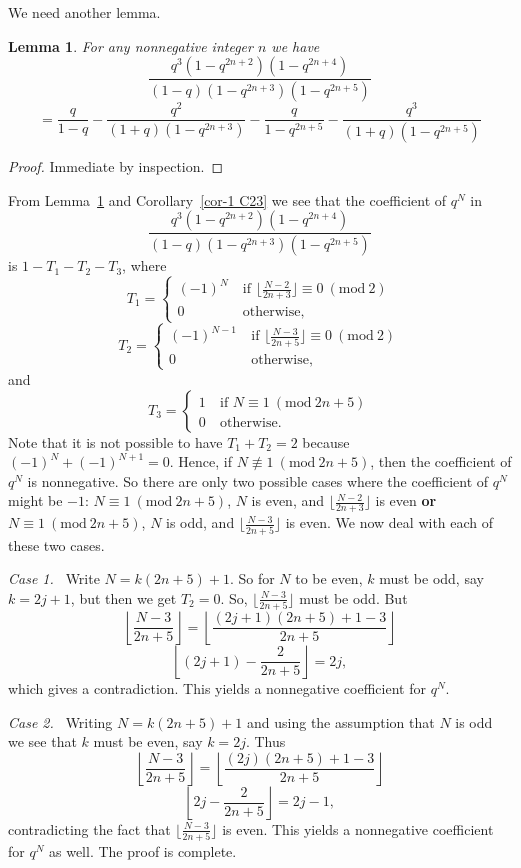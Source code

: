 \documentclass[reqno]{amsart}
\theoremstyle{definition}
\theoremstyle{plain}
\newtheorem{lemma}      {Lemma}
\theoremstyle{remark}
\numberwithin{equation}{section}
\newcommand{\Mod}[1]{\ (\mathrm{mod}\ #1)}
\newcommand{\fr}{\frac}
\begin{document}
%
We need another lemma.
\begin{lemma}\label{lem-2 C23}
For any nonnegative integer $n$ we have
\[
\fr{q^3(1-q^{2n+2})(1-q^{2n+4})}{(1-q)(1-q^{2n+3})(1-q^{2n+5})}
\]
\[
=\fr{q}{1-q}-\fr{q^2}{(1+q)(1-q^{2n+3})}-\fr{q}{1-q^{2n+5}} -\fr{q^3}{(1+q)(1-q^{2n+5})}
\]
\end{lemma}
\begin{proof}
Immediate by inspection.
\end{proof}
From Lemma~\ref{lem-2 C23} and Corollary~\ref{cor-1 C23} we see that the coefficient of $q^N$ in
\[
\fr{q^3(1-q^{2n+2})(1-q^{2n+4})}{(1-q)(1-q^{2n+3})(1-q^{2n+5})}
\]
is $1-T_1-T_2-T_3$,
where
\[
T_1=
 \begin{cases}
(-1)^N &\ \text{if\ }\lfloor \fr{N-2}{2n+3} \rfloor \equiv 0\Mod{2} \\
0&\ \text{otherwise},
\end{cases}
\]
\[
T_2=
\begin{cases}
(-1)^{N-1} &\ \text{if\ }\lfloor \fr{N-3}{2n+5} \rfloor \equiv 0\Mod{2} \\
0&\ \text{otherwise},
\end{cases}
\]
and
\[
T_3=
\begin{cases}
1 &\ \text{if\ } N \equiv 1 \Mod{2n+5} \\
0&\ \text{otherwise}.
\end{cases}
\]
Note that it is not possible to have $T_1+T_2 =2$ because $(-1)^N + (-1)^{N+1} =0$. Hence, if $N\not\equiv 1\Mod{2n+5}$, then
the coefficient of $q^N$ is nonnegative. So there are only two possible cases where the coefficient of $q^N$ might be $-1$:
$N\equiv 1\Mod{2n+5}$, $N$ is even, and $\lfloor \fr{N-2}{2n+3}\rfloor$ is even {\bf or}
$N\equiv 1\Mod{2n+5}$, $N$ is odd, and $\lfloor \fr{N-3}{2n+5}\rfloor$ is even. We now deal with each of these two cases.

\emph{Case 1.\ } Write $N=k(2n+5)+1$. So for $N$ to be even, $k$ must be odd, say $k=2j+1$, but then we get $T_2=0$. So,
$\lfloor \fr{N-3}{2n+5} \rfloor$ must be odd. But
\[
\left\lfloor \fr{N-3}{2n+5} \right\rfloor = \left\lfloor \fr{(2j+1)(2n+5)+1-3}{2n+5} \right\rfloor
\]
\[
\left\lfloor (2j+1)-\fr{2}{2n+5}\right\rfloor = 2j,
\]
which gives a contradiction. This yields a nonnegative coefficient for $q^N$.

\emph{Case 2.\ } Writing $N=k(2n+5)+1$ and using the assumption that $N$ is odd we see that $k$ must be even, say $k=2j$. Thus
\[
\left\lfloor \fr{N-3}{2n+5} \right\rfloor = \left\lfloor \fr{(2j)(2n+5)+1-3}{2n+5} \right\rfloor
\]
\[
\left\lfloor 2j-\fr{2}{2n+5}\right\rfloor = 2j-1,
\]
contradicting the fact that $\lfloor \fr{N-3}{2n+5} \rfloor$ is even. This yields a nonnegative coefficient for $q^N$ as well.
The proof is complete.
%
\end{document}
